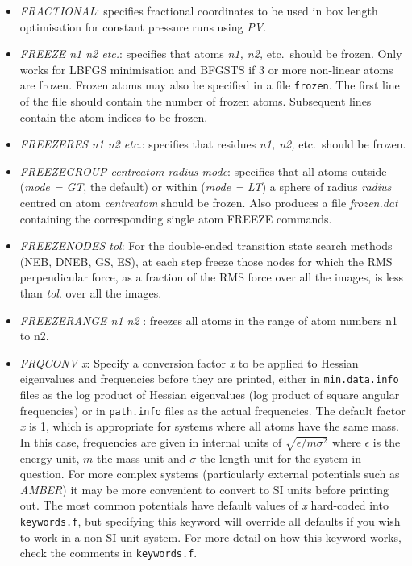 \documentclass[12pt,a4paper,dvips]{article}
\begin{document}
\begin{itemize}
\item {\it FRACTIONAL\/}: specifies fractional coordinates to be used in box length
      optimisation for constant pressure runs using {\it PV\/}.

\item {\it FREEZE n1 n2 etc.\/}: specifies that atoms {\it n1, n2,\/} etc.~should be frozen.
Only works for LBFGS minimisation and BFGSTS if 3 or more non-linear atoms are frozen.
Frozen atoms may also be specified in a file {\tt frozen}. The first line of the file should contain the number of frozen atoms. Subsequent lines contain the atom indices to be frozen.

\item {\it FREEZERES n1 n2 etc.\/}: specifies that residues {\it n1, n2,\/} etc.~should be frozen.

\item {\it FREEZEGROUP centreatom radius mode\/}: specifies that all atoms outside ({\it mode = GT\/}, the default) 
or within ({\it mode = LT\/}) a sphere of radius {\it radius\/} centred on atom {\it centreatom\/} should be frozen.
Also produces a file {\it frozen.dat\/} containing the corresponding single atom FREEZE commands. 

\item {\it FREEZENODES tol\/}: For the double-ended transition state search
methods (NEB, DNEB, GS, ES), at each step freeze those nodes for which the RMS
perpendicular force, as a fraction of the RMS force over all the images, is
less than {\it tol\/}.  over all the images.

\item {\it FREEZERANGE n1 n2 \/}: freezes all atoms in the range of atom numbers n1 to n2.

\item {\it FRQCONV x\/}: Specify a conversion factor {\it x} to be applied to Hessian eigenvalues and frequencies before they are printed, either in {\tt min.data.info} files as the log product of Hessian eigenvalues (log product of square angular frequencies) or in {\tt path.info} files as the actual frequencies. The default factor {\it x} is 1, which is appropriate for systems where all atoms have the same mass. In this case, frequencies are given in internal units of $\sqrt{\epsilon/m\sigma^2}$ where $\epsilon$ is the energy unit, $m$ the mass unit and $\sigma$ the length unit for the system in question. For more complex systems (particularly external potentials such as {\it AMBER}) it may be more convenient to convert to SI units before printing out. The most common potentials have default values of {\it x} hard-coded into {\tt keywords.f}, but specifying this keyword will override all defaults if you wish to work in a non-SI unit system. For more detail on how this keyword works, check the comments in {\tt keywords.f}.


\end{itemize}
\end{document}
